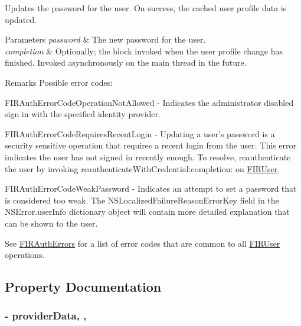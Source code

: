 Updates the password for the user. On success, the cached user profile data is updated. 


\begin{DoxyParams}{Parameters}
{\em password} & The new password for the user. \\
\hline
{\em completion} & Optionally; the block invoked when the user profile change has finished. Invoked asynchronously on the main thread in the future. \\
\hline
\end{DoxyParams}
\begin{DoxyRemark}{Remarks}
Possible error codes\+:
\begin{DoxyItemize}
\item {\ttfamily F\+I\+R\+Auth\+Error\+Code\+Operation\+Not\+Allowed} -\/ Indicates the administrator disabled sign in with the specified identity provider.
\item {\ttfamily F\+I\+R\+Auth\+Error\+Code\+Requires\+Recent\+Login} -\/ Updating a user’s password is a security sensitive operation that requires a recent login from the user. This error indicates the user has not signed in recently enough. To resolve, reauthenticate the user by invoking reauthenticate\+With\+Credential\+:completion\+: on \hyperlink{interface_f_i_r_user}{F\+I\+R\+User}.
\item {\ttfamily F\+I\+R\+Auth\+Error\+Code\+Weak\+Password} -\/ Indicates an attempt to set a password that is considered too weak. The N\+S\+Localized\+Failure\+Reason\+Error\+Key field in the N\+S\+Error.\+user\+Info dictionary object will contain more detailed explanation that can be shown to the user.
\item See {\ttfamily \hyperlink{interface_f_i_r_auth_errors}{F\+I\+R\+Auth\+Errors}} for a list of error codes that are common to all \hyperlink{interface_f_i_r_user}{F\+I\+R\+User} operations. 
\end{DoxyItemize}
\end{DoxyRemark}


\subsection{Property Documentation}
\hypertarget{interface_f_i_r_user_abe650825963214d5f24891f7cbe0e395}{}
\subsubsection[{provider\+Data}]{\setlength{\rightskip}{0pt plus 5cm}-\/ provider\+Data\hspace{0.3cm}{\ttfamily [read]}, {\ttfamily [nonatomic]}, {\ttfamily [assign]}}\label{interface_f_i_r_user_abe650825963214d5f24891f7cbe0e395}



